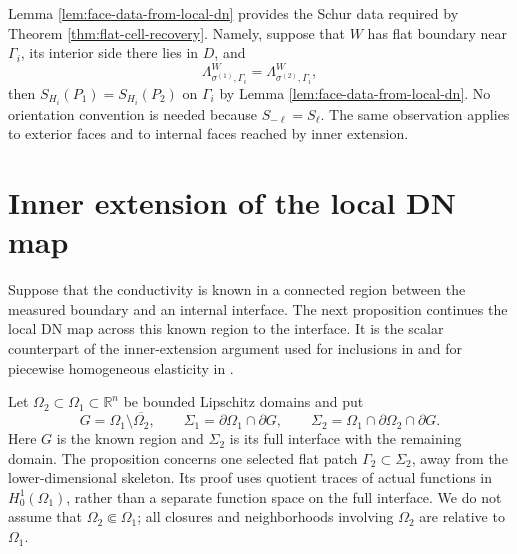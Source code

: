 \documentclass[10pt,a4paper]{amsart}
\newcommand{\R}{\mathbb R}
\newcommand{\DN}{\Lambda}
\begin{document}
Lemma \ref{lem:face-data-from-local-dn} provides the Schur data required by
Theorem \ref{thm:flat-cell-recovery}.  Namely, suppose that \(W\) has flat
boundary near \(\Gamma_i\), its interior side there lies in \(D\), and
\begin{equation}
  \DN^W_{\sigma^{(1)},\Gamma_i}=\DN^W_{\sigma^{(2)},\Gamma_i},
\end{equation}
then \(S_{H_i}(P_1)=S_{H_i}(P_2)\) on \(\Gamma_i\) by Lemma
\ref{lem:face-data-from-local-dn}.  No orientation convention is needed because
\(S_{-\ell}=S_\ell\).  The same observation applies to exterior faces and to
internal faces reached by inner extension.


\section{Inner extension of the local DN map}
\label{sec:inner-extension}

Suppose that the conductivity is known in a connected region between the
measured boundary and an internal interface.  The next proposition continues
the local DN map across this known region to the interface.  It is the scalar
counterpart of the inner-extension argument used for inclusions in
\cite{Ikehata2002} and for piecewise homogeneous elasticity in
\cite{CarsteaHondaNakamura2018}.

Let \(\Omega_2\subset\Omega_1\subset\R^n\) be bounded Lipschitz domains and put
\begin{equation}
  G=\Omega_1\setminus\overline{\Omega_2},
  \qquad
  \Sigma_1=\partial\Omega_1\cap\partial G,
  \qquad
  \Sigma_2=\Omega_1\cap\partial\Omega_2\cap\partial G .
\end{equation}
Here \(G\) is the known region and \(\Sigma_2\) is its full interface with the
remaining domain.  The proposition concerns one selected flat patch
\(\Gamma_2\subset\Sigma_2\), away from the lower-dimensional skeleton.  Its
proof uses quotient traces of actual functions in \(H^1_0(\Omega_1)\), rather
than a separate function space on the full interface.  We do not assume that
\(\Omega_2\Subset\Omega_1\); all closures and neighborhoods involving
\(\Omega_2\) are relative to \(\Omega_1\).
\end{document}
